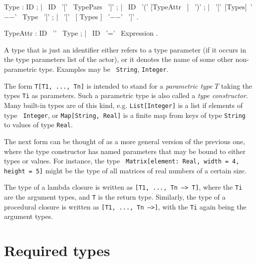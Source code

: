 \bgr
Type : ID ;
     | ~ID ~'[' ~TypePars ~']' ;
     | ~ID ~'(' [TypeAttr ~] ~')' ;
     | ~'['~[Types]~'$-$$-$\charMore' ~Type ~']' ;
     | ~'[' ~[ Types ] ~'$-$$-$\charMore' ~']' .

TypeAttr : ID ~'\charColon' ~Type ;
     | ~ID ~'=' ~Expression .
\egr

A type that is just an identifier either refers to a type parameter
(if it occurs in the type parameters list of the actor), or it denotes
the name of some other non-parametric type. Examples may be {\tt
  String}, {\tt Integer}.

 
The form {\tt T[T1, ..., Tn]} is intended to stand for a {\em parametric type}
$T$ taking the types {\tt Ti} as parameters. Such a parametric type is also
called a {\em type constructor}. Many built-in types are of
this kind, e.g. {\tt List[Integer]} is a list if elements of type {\tt
  Integer}, or {\tt Map[String, Real]} is a finite map from keys of
type {\tt String} to values of type {\tt Real}.

The next form can be thought of as a more general version of the
previous one, where the type constructor has named parameters that may
be bound to either types or values. For instance, the type {\tt
  Matrix[element: Real, width = 4, height = 5]} might be the type of
all matrices of real numbers of a certain size.

The type of a lambda closure is written as {\tt [T1, ..., Tn --> T]},
where the {\tt Ti} are the argument types, and {\tt T} is the return
type. Similarly, the type of a procedural closure is written as {\tt [T1,
..., Tn -->]}, with the {\tt Ti} again being the argument types.



\section{Required types}\label{sect:BuiltInTypes}



